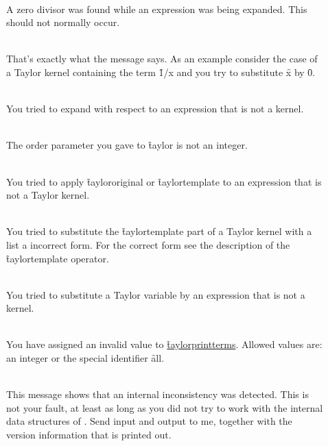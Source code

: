 \begin{description}
\item[]\mbox{}\\
    A zero divisor was found while an expression was being expanded.
    This should not normally occur.

\item[]\mbox{}\\
    That's exactly what the message says.  As an example consider the
    case of a Taylor kernel containing the term \f{1/x} and you try
    to substitute \f{x} by \f{0}.

\item[]\mbox{}\\
    You tried to expand with respect to an expression that is not a
    kernel.

\item[]\mbox{}\\
    The order parameter you gave to \f{taylor} is not an integer.

\item[]\mbox{}\\
 
    You tried to apply \f{taylororiginal} or \f{taylortemplate}
    to an expression that is not a Taylor kernel.

\item[]\mbox{}\\
    You tried to substitute the \f{taylortemplate} part of a Taylor
    kernel with a list a incorrect form. For the correct form see the
    description of the \f{taylortemplate} operator.

\item[]\mbox{}\\
    You tried to substitute a Taylor variable by an expression that is
    not a kernel.

\item[]\mbox{}\\
    You have assigned an invalid value to \hyperlink{reserved:TAYLORPRINTTERMS}{\f{taylorprintterms}}.
    Allowed values are: an integer or the special identifier
    \f{all}.

\item[]\mbox{}\\
    This message shows that an internal inconsistency was detected.
    This is not your fault, at least as long as you did not try to
    work with the internal data structures of \REDUCE. Send input
    and output to me, together with the version information that is
    printed out.

\end{description}

